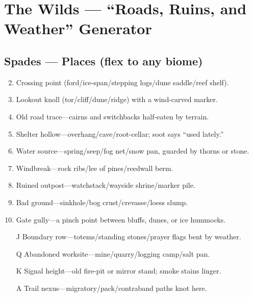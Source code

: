 \chapter{The Wilds --- ``Roads, Ruins, and Weather'' Generator}
\label{chap:wilderness}

\section*{Spades --- Places (flex to any biome)}
\label{sec:wilderness-places}
\begin{enumerate}
\setcounter{enumi}{1}
\item Crossing point (ford/ice-span/stepping logs/dune saddle/reef shelf).
\item Lookout knoll (tor/cliff/dune/ridge) with a wind-carved marker.
\item Old road trace---cairns and switchbacks half-eaten by terrain.
\item Shelter hollow---overhang/cave/root-cellar; soot says ``used lately.''
\item Water source---spring/seep/fog net/snow pan, guarded by thorns or stone.
\item Windbreak---rock ribs/lee of pines/reedwall berm.
\item Ruined outpost---watchstack/wayside shrine/marker pile.
\item Bad ground---sinkhole/bog crust/crevasse/loess slump.
\item Gate gully---a pinch point between bluffs, dunes, or ice hummocks.
\item[J] Boundary row---totems/standing stones/prayer flags bent by weather.
\item[Q] Abandoned worksite---mine/quarry/logging camp/salt pan.
\item[K] Signal height---old fire-pit or mirror stand; smoke stains linger.
\item[A] Trail nexus---migratory/pack/contraband paths knot here.
\end{enumerate}

